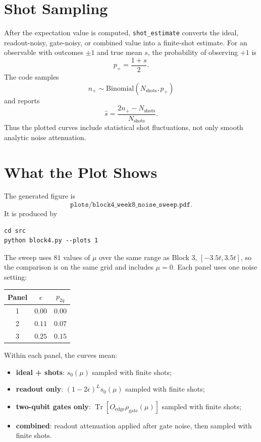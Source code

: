 \documentclass[11pt]{article}
\newcommand{\Tr}{\operatorname{Tr}}
\begin{document}
\section{Shot Sampling}

After the expectation value is computed, \texttt{shot\_estimate} converts the ideal, readout-noisy, gate-noisy, or combined value into a finite-shot estimate. For an observable with outcomes $\pm1$ and true mean $s$, the probability of observing $+1$ is
\[
  p_+ = \frac{1+s}{2}.
\]
The code samples
\[
  n_+\sim\mathrm{Binomial}(N_{\mathrm{shots}},p_+)
\]
and reports
\[
  \hat{s}=\frac{2n_+-N_{\mathrm{shots}}}{N_{\mathrm{shots}}}.
\]
Thus the plotted curves include statistical shot fluctuations, not only smooth analytic noise attenuation.

\section{What the Plot Shows}

The generated figure is
\[
  \texttt{plots/block4\_week8\_noise\_sweep.pdf}.
\]
It is produced by
\begin{verbatim}
cd src
python block4.py --plots 1
\end{verbatim}

The sweep uses $81$ values of $\mu$ over the same range as Block 3, $[-3.5t,3.5t]$, so the comparison is on the same grid and includes $\mu=0$. Each panel uses one noise setting:
\begin{center}
\begin{tabular}{ccc}
\toprule
Panel & $\epsilon$ & $p_{2q}$ \\
\midrule
1 & $0.00$ & $0.00$ \\
2 & $0.11$ & $0.07$ \\
3 & $0.25$ & $0.15$ \\
\bottomrule
\end{tabular}
\end{center}

Within each panel, the curves mean:
\begin{itemize}
  \item \textbf{ideal + shots}: $s_0(\mu)$ sampled with finite shots;
  \item \textbf{readout only}: $(1-2\epsilon)^L s_0(\mu)$ sampled with finite shots;
  \item \textbf{two-qubit gates only}: $\Tr[O_{\mathrm{edge}}\rho_{\mathrm{gate}}(\mu)]$ sampled with finite shots;
  \item \textbf{combined}: readout attenuation applied after gate noise, then sampled with finite shots.
\end{itemize}
\end{document}
